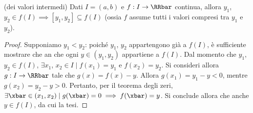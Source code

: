 \documentclass[11pt]{article}
\begin{document}
	\begin{corollary} (dei valori intermedi) Dati $I = (a, b)$ e
		$f : I \to \RRbar$ continua, allora $y_1$, $y_2 \in f(I) \implies
		[y_1, y_2] \subseteq f(I)$ (ossia $f$ assume tutti i valori
		compresi tra $y_1$ e $y_2$).
	\end{corollary}

	\begin{proof}
		Supponiamo $y_1 < y_2$: poiché $y_1$, $y_2$ appartengono già a $f(I)$, è sufficiente mostrare che an che ogni $y \in (y_1, y_2)$ appartiene a $f(I)$. Dal momento che $y_1$, $y_2 \in f(I)$, $\exists x_1$, $x_2 \in I \mid f(x_1) = y_1$ e $f(x_2) = y_2$. Si consideri allora $g : I \to \RRbar$ tale che
		$g(x) = f(x) - y$. Allora $g(x_1) = y_1 - y < 0$, mentre $g(x_2) = y_2 - y > 0$. Pertanto, per il teorema
		degli zeri, $\exists \xbar \in (x_1, x_2) \mid g(\xbar) = 0 \implies f(\xbar) = y$. Si conclude allora che anche
		$y \in f(I)$, da cui la tesi. 
	\end{proof}
\end{document}
